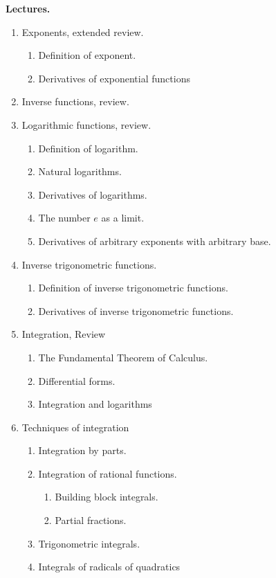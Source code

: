 \documentclass{article}
\begin{document}
\medskip
\noindent \textbf{Lectures.} 
\renewcommand{\theenumii}{\arabic{enumii}}
\begin{enumerate}
\item Exponents, extended review.
\begin{enumerate}
\item Definition of exponent.
\item Derivatives of exponential functions
\end{enumerate}
\item Inverse functions, review.
\item Logarithmic functions, review.
\begin{enumerate}
\item Definition of logarithm.
\item Natural logarithms.
\item Derivatives of logarithms.
\item The number $e$ as a limit.
\item Derivatives of arbitrary exponents with arbitrary base.
\end{enumerate}
\item Inverse trigonometric functions.
\begin{enumerate}
\item Definition of inverse trigonometric functions.
\item Derivatives of inverse trigonometric functions.
\end{enumerate}
\item Integration, Review
\begin{enumerate}
\item The Fundamental Theorem of Calculus.
\item Differential forms.
\item Integration and logarithms
\end{enumerate}
\item Techniques of integration
\begin{enumerate}
\item Integration by parts.
\item Integration of rational functions.
\begin{enumerate}
\item Building block integrals.
\item Partial fractions.
\end{enumerate}
\item Trigonometric integrals.
\item Integrals of radicals of quadratics
\begin{enumerate}

\end{enumerate}
\end{enumerate}
\end{enumerate}
\end{document}
